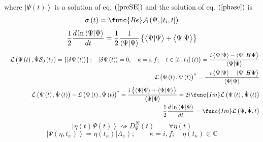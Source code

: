 \documentclass[aps,preprint]{revtex4}
\begin{document}
where $\left| \Psi \left( t\right) \right\rangle $ is a solution of eq. $%
\left( \ref{preSE}\right) $ and the solution of eq. $\left( \ref{phase}%
\right) $ is 
\begin{equation}
\sigma \left( t\right) =\func{Re}\mathcal{A}\left( \Psi ,\left[ t_{i},t%
\right] \right)
\end{equation}%
\begin{equation}
\frac{1}{2}\frac{d\ln \left\langle \Psi |\Psi \right\rangle }{dt}=\frac{1}{2}%
\frac{1}{\left\langle \Psi |\Psi \right\rangle }\left\{ \left\langle \dot{%
\Psi}|\Psi \right\rangle +\left\langle \Psi |\dot{\Psi}\right\rangle \right\}
\end{equation}%
\begin{eqnarray}
&&\mathcal{L}\left( \Psi \left( t\right) ,\dot{\Psi}\mathcal{S}_{0}\left(
t_{f}\right) =\left\{ \left| \delta \Psi \left( t\right) \right\rangle
\right\} ;\quad \left| \delta \Psi \left( t\right) \right\rangle =0,\quad
\kappa =i,f;\quad t\in \left[ t_{i},t_{f}\right] \left( t\right) \right) =%
\frac{i\left\langle \Psi |\dot{\Psi}\rangle -\left\langle \Psi \right| H\Psi
\right\rangle }{\left\langle \Psi |\Psi \right\rangle } \\
&&\mathcal{L}\left( \Psi \left( t\right) ,\dot{\Psi}\left( t\right) \right)
^{\ast }=\frac{-i\left\langle \dot{\Psi}|\Psi \rangle -\left\langle \Psi
\right| H\Psi \right\rangle }{\left\langle \Psi |\Psi \right\rangle } \\
&&\mathcal{L}\left( \Psi \left( t\right) ,\dot{\Psi}\left( t\right) \right) -%
\mathcal{L}\left( \Psi \left( t\right) ,\dot{\Psi}\left( t\right) \right)
^{\ast }=\frac{i\left\{ \langle \Psi |\dot{\Psi}\rangle +\langle \dot{\Psi}%
|\Psi \rangle \right\} }{\left\langle \Psi |\Psi \right\rangle }=2i\func{Im}%
\mathcal{L}\left( \Psi \left( t\right) ,\dot{\Psi}\left( t\right) \right) \\
&&\frac{1}{2}\frac{d\ln \left\langle \Psi |\Psi \right\rangle }{dt}=\func{Im}%
\mathcal{L}\left( \Psi ,\dot{\Psi},t\right)
\end{eqnarray}%
\begin{equation}
\left| \eta \left( t\right) \Psi \left( t\right) \right\rangle
\rightsquigarrow D_{\Psi }^{N}\left( t\right) \qquad \forall \eta \left(
t\right)
\end{equation}%
\begin{equation}
\left| \Psi \left( \eta ,t_{\kappa }\right) \right\rangle =\eta \left(
t_{\kappa }\right) \left| \Lambda _{\kappa }\right\rangle ;\qquad \kappa
=i,f;\quad \eta \left( t_{\kappa }\right) \in \mathbb{C}
\end{equation}%
\end{document}
